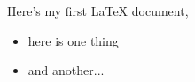\documentclass[12pt]{article}
\title{}
\author{Logan Schmidt}
\date{Jul 8 2022}
\begin{document}
\maketitle

Here's my first LaTeX document,

\begin{itemize}
  \item here is one thing
  \item and another...
\end{itemize}
\end{document}
